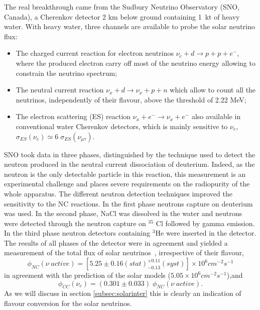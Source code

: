 The real breakthrough came from the Sudbury Neutrino Observatory (SNO, Canada), a Cherenkov detector 2 km below ground containing 1~kt of heavy water. 
With heavy water, three channels are available to probe the solar neutrino flux: 
\begin{itemize}
\item The charged current reaction for electron neutrinos $ \nu_e + d \rightarrow p + p + e^−$, where the produced electron carry off most of the neutrino energy allowing to constrain the neutrino spectrum;
\item The neutral current reaction $ \nu_x + d \rightarrow \nu_x +  p + n $ which allow to count all the neutrinos, independently of their flavour, above the threshold of 2.22 MeV; 
\item The electron scattering (ES) reaction $ \nu_x + e^- \rightarrow \nu_x + e^−$ also available in conventional water Cherenkov detectors, which is mainly sensitive to $ \nu_e$, $\sigma_{ES}(\nu_e)\simeq 6 \; \sigma_{ES}(\nu_{\mu \tau})$. 
\end{itemize}
SNO took data in three phases, distinguished by the technique used to detect the neutron produced in the neutral current dissociation of deuterium. Indeed, as the neutron is the only detectable particle in this reaction, this measurement is an experimental challenge and places severe requirements on the radiopurity of the whole apparatus. The different neutron detection techniques improved the sensitivity to the NC reactions. In the first phase neutrons capture on deuterium was used. In the second phase, NaCl was dissolved in the water and neutrons were detected through the neutron capture on $^{35}$ Cl followed by gamma emission. In the third phase neutron detectors containing $^3$He were inserted in the detector.
The results of all phases of the detector were in agreement and yielded a measurement of the total flux of solar neutrinos~\cite{aharmim}, irrespective of their flavour,
\begin{equation}
\phi_{NC} (\nu \; active ) = [5.25 \pm 0.16 (stat) ^{+0.11}
_{-0.13} (syst)] \times 10^6 cm^{-2} s^{-1} 
\end{equation}
in agreement with the prediction of the solar models ($5.05 \times 10^6 cm^{-2} s^{-1}$),and 
\begin{equation}
\phi_{CC} (\nu_e ) =  (0.301 \pm 0.033) \; \phi_{NC} (\nu \; active ).
\end{equation}
As we will discuss in section
 \ref{subsec:solarinter} this is clearly an indication of flavour conversion for the solar neutrinos. 

